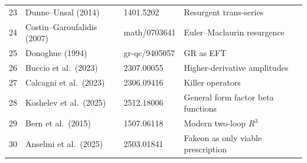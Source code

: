 \documentclass[12pt,a4paper]{article}
\begin{document}
\begin{longtable}{cllp{6cm}}
23 & Dunne--Unsal (2014) & 1401.5202 & Resurgent trans-series \\
24 & Costin--Garoufalidis (2007) & math/0703641 & Euler--Maclaurin resurgence \\
25 & Donoghue (1994) & gr-qc/9405057 & GR as EFT \\
26 & Buccio et al.\ (2023) & 2307.00055 & Higher-derivative amplitudes \\
27 & Calcagni et al.\ (2023) & 2306.09416 & Killer operators \\
28 & Koshelev et al.\ (2025) & 2512.18006 & General form factor beta functions \\
29 & Bern et al.\ (2015) & 1507.06118 & Modern two-loop $R^3$ \\
30 & Anselmi et al.\ (2025) & 2503.01841 & Fakeon as only viable prescription \\
\bottomrule
\end{longtable}
\end{document}
